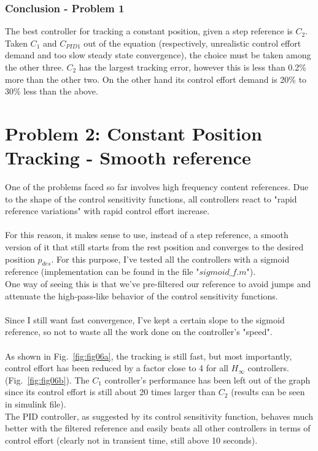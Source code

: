 \documentclass[a4paper, 12pt]{article}
\begin{document}
\subsubsection{Conclusion - Problem 1}
The best controller for tracking a constant position, given a step reference is $C_2$. \\Taken $C_1$ and $C_{PID1}$ out of the equation (respectively, unrealistic control effort demand and too slow steady state convergence), the choice must be taken among the other three.
$C_2$ has the largest tracking error, however this is less than 0.2\% more than the other two. On the other hand its control effort demand is 20\% to 30\% less than the above.
\clearpage
\section{Problem 2: Constant Position Tracking - Smooth reference}
One of the problems faced so far involves high frequency content references. Due to the shape of the control sensitivity functions, all controllers react to "rapid reference variations" with rapid control effort increase.\\\\
For this reason, it makes sense to use, instead of a step reference, a smooth version of it that still starts from the rest position and converges to the desired position $p_{des}$. For this purpose, I've tested all the controllers with a sigmoid reference (implementation can be found in the file "$sigmoid\_f.m$").
\\
One way of seeing this is that we've pre-filtered our reference to avoid jumps and attenuate the high-pass-like behavior of the control sensitivity functions.
\\\\
Since I still want fast convergence, I've kept a certain slope to the sigmoid reference, so not to waste all the work done on the controller's "speed".
\\\\
As shown in Fig.~\ref{fig:fig06a}, the tracking is still fast, but most importantly, control effort has been reduced by a factor close to 4 for all $H_\infty$ controllers. (Fig.~\ref{fig:fig06b}). The $C_1$ controller's performance has been left out of the graph since its control effort is still about 20 times larger than $C_2$ (results can be seen in simulink file).\\The PID controller, as suggested by its control sensitivity function, behaves much better with the filtered reference and easily beats all other controllers in terms of control effort (clearly not in transient time, still above 10 seconds).
\end{document}
